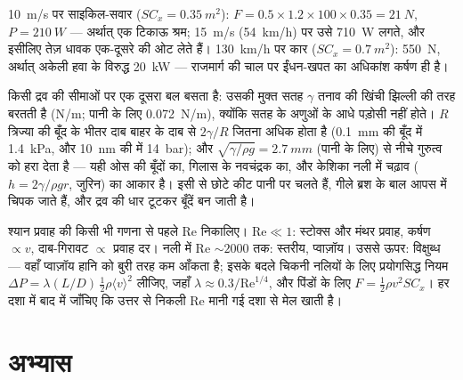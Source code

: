 \begin{example}[साइकिल-सवार, कार]\label{ex:b2:viscous-flows:cyclist}
\qty{10}{m/s} पर साइकिल-सवार ($SC_x = \qty{0.35}{m^2}$): $F = 0.5 \times 1.2 \times 100
\times 0.35 = \qty{21}{N}$, $P = \qty{210}{W}$ --- अर्थात् एक टिकाऊ श्रम; \qty{15}{m/s}
(\qty{54}{km/h}) पर उसे \qty{710}{W} लगते, और इसीलिए तेज़ धावक एक-दूसरे की ओट लेते हैं।
\qty{130}{km/h} पर कार ($SC_x = \qty{0.7}{m^2}$): \qty{550}{N}, अर्थात् अकेली हवा के
विरुद्ध \qty{20}{kW} --- राजमार्ग की चाल पर ईंधन-खपत का अधिकांश कर्षण ही है।
\end{example}

\begin{remark}[पृष्ठ तनाव]\label{rem:b2:viscous-flows:capillarity}
किसी द्रव की सीमाओं पर एक दूसरा बल बसता है: उसकी मुक्त सतह
$\gamma$ तनाव की खिंची झिल्ली की तरह बरतती है (\unit{N/m}; पानी के लिए
\qty{0.072}{N/m}), क्योंकि सतह के अणुओं के आधे पड़ोसी नहीं होते।
$R$ त्रिज्या की बूँद के भीतर दाब बाहर के दाब से \emph{}
$2\gamma/R$ जितना अधिक होता है (\qty{0.1}{mm} की बूँद में \qty{1.4}{kPa},
और \qty{10}{nm} की में \qty{14}{bar}); और \emph{}
$\sqrt{\gamma/\rho g} = \qty{2.7}{mm}$ (पानी के लिए) से नीचे  गुरुत्व को हरा देता है ---
यही ओस की बूँदों का, गिलास के नवचंद्रक का, और केशिका नली में चढ़ाव
($h = 2\gamma/\rho gr$, जुरिन) का आकार है। इसी से छोटे कीट पानी पर चलते
हैं, गीले ब्रश के बाल आपस में चिपक जाते हैं, और द्रव की धार
टूटकर बूँदें बन जाती है।
\end{remark}

\begin{method}[कौन-सी दशा?]\label{met:b2:viscous-flows:regime}
श्यान प्रवाह की किसी भी गणना से पहले $\mathrm{Re}$ निकालिए। $\mathrm{Re} \ll 1$:
स्टोक्स और मंथर प्रवाह, कर्षण $\propto v$, दाब-गिरावट $\propto$ प्रवाह
दर। नली में $\mathrm{Re}$ $\sim\!2000$ तक: स्तरीय, प्वाज़ॉय। उससे ऊपर:
विक्षुब्ध --- वहाँ प्वाज़ॉय हानि को बुरी तरह कम आँकता है; इसके बदले
चिकनी नलियों के लिए प्रयोगसिद्ध नियम $\Delta P = \lambda(L/D)\,\tfrac12\rho\langle v\rangle^2$ लीजिए, जहाँ $\lambda
\approx 0.3/\mathrm{Re}^{1/4}$, और पिंडों के लिए $F = \tfrac12\rho v^2SC_x$।
हर दशा में बाद में जाँचिए कि उत्तर से निकली $\mathrm{Re}$
मानी गई दशा से मेल खाती है।
\end{method}

\section{अभ्यास}


